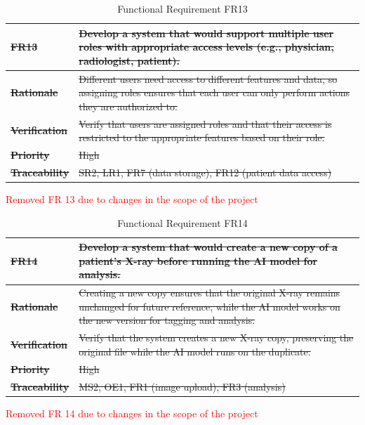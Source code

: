 \documentclass[12pt]{article}
\begin{document}
\begin{table}[h!]
\centering
{}
\begin{tabular}{|p{3.5cm}|p{11.5cm}|}
\hline
\rowcolor{gray!30}
\sout{\textbf{FR13}} & \sout{Develop a system that would support multiple user roles with appropriate access levels (e.g., physician, radiologist, patient).} \\
\hline
\sout{\textbf{Rationale}} & \sout{Different users need access to different features and data, so assigning roles ensures that each user can only perform actions they are authorized to.} \\
\hline
\sout{\textbf{Verification}} & \sout{Verify that users are assigned roles and that their access is restricted to the appropriate features based on their role.} \\
\hline
\sout{\textbf{Priority}} & \sout{High} \\
\hline
\sout{\textbf{Traceability}} &  \sout{SR2, LR1, FR7 (data storage), FR12 (patient data access)} \\
\hline
\end{tabular}
\caption{Functional Requirement FR13}
\textcolor{red}{Removed FR 13 due to changes in the scope of the project}
\end{table}
\begin{table}[h!]
\centering
{}
\begin{tabular}{|p{3.5cm}|p{11.5cm}|}
\hline
\rowcolor{gray!30}
\sout{\textbf{FR14}} & \sout{Develop a system that would create a new copy of a patient's X-ray before running the AI model for analysis.} \\
\hline
\sout{\textbf{Rationale}} & \sout{Creating a new copy ensures that the original X-ray remains unchanged for future reference, while the AI model works on the new version for tagging and analysis.} \\
\hline
\sout{\textbf{Verification}} & \sout{Verify that the system creates a new X-ray copy, preserving the original file while the AI model runs on the duplicate.} \\
\hline
\sout{\textbf{Priority}} & \sout{High} \\
\hline
\sout{\textbf{Traceability}} & \sout{MS2, OE1, FR1 (image upload), FR3 (analysis)} \\
\hline
\end{tabular}
\caption{Functional Requirement FR14}
\textcolor{red}{Removed FR 14 due to changes in the scope of the project}
\end{table}
\end{document}
